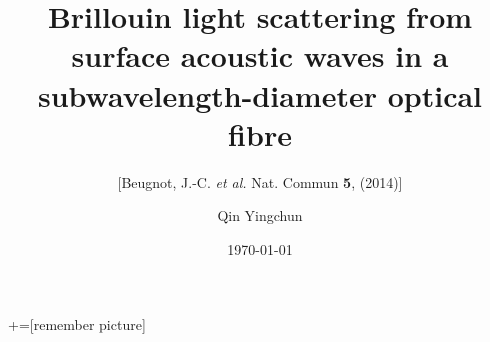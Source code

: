 \documentclass{beamer}
\def\etal{\emph{et al. }}
\begin{document}
+=[remember picture]
\everymath{\displaystyle}
\title[]{Brillouin light scattering from surface acoustic
waves in a subwavelength-diameter optical fibre }
\subtitle{[Beugnot, J.-C. \etal Nat. Commun \textbf{5}, (2014)]}
\author[]{Qin Yingchun}
%
\date{\today}
\begin{frame}
\maketitle
\end{frame}



\end{document}
